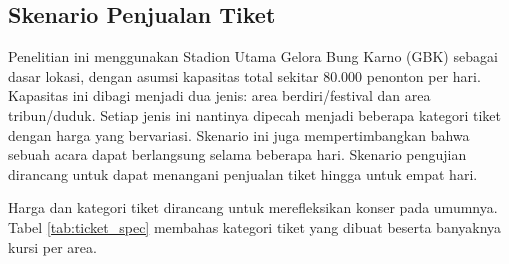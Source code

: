 \subsection{Skenario Penjualan Tiket}

Penelitian ini menggunakan Stadion Utama Gelora Bung Karno (GBK) sebagai dasar lokasi, dengan asumsi kapasitas total sekitar 80.000 penonton per hari. Kapasitas ini dibagi menjadi dua jenis: area berdiri/festival dan area tribun/duduk. Setiap jenis ini nantinya dipecah menjadi beberapa kategori tiket dengan harga yang bervariasi. Skenario ini juga mempertimbangkan bahwa sebuah acara dapat berlangsung selama beberapa hari. Skenario pengujian dirancang untuk dapat menangani penjualan tiket hingga untuk empat hari.

Harga dan kategori tiket dirancang untuk merefleksikan konser pada umumnya. Tabel \ref{tab:ticket_spec} membahas kategori tiket yang dibuat beserta banyaknya kursi per area.

